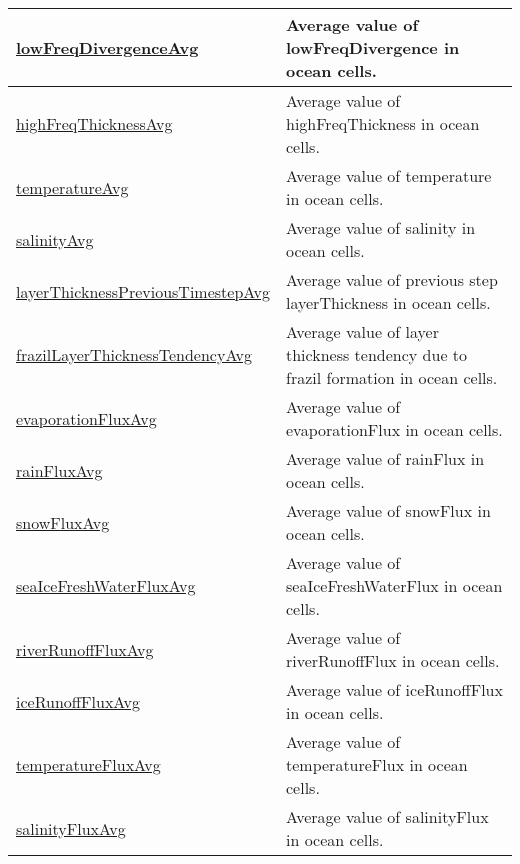 {\begin{center}
\begin{longtable}{| p{2.0in} | p{4.0in} |}
    \hline
    \hyperref[subsec:var_sec_globalStatsAM_lowFreqDivergenceAvg]{lowFreqDivergenceAvg} & Average value of lowFreqDivergence in ocean cells. \\
    \hline
    \hyperref[subsec:var_sec_globalStatsAM_highFreqThicknessAvg]{highFreqThicknessAvg} & Average value of highFreqThickness in ocean cells. \\
    \hline
    \hyperref[subsec:var_sec_globalStatsAM_temperatureAvg]{temperatureAvg} & Average value of temperature in ocean cells. \\
    \hline
    \hyperref[subsec:var_sec_globalStatsAM_salinityAvg]{salinityAvg} & Average value of salinity in ocean cells. \\
    \hline
    \hyperref[subsec:var_sec_globalStatsAM_layerThicknessPreviousTimestepAvg]{layerThicknessPreviousTimestep\-Avg} & Average value of previous step layerThickness in ocean cells. \\
    \hline
    \hyperref[subsec:var_sec_globalStatsAM_frazilLayerThicknessTendencyAvg]{frazilLayerThicknessTendencyAvg} & Average value of layer thickness tendency due to frazil formation in ocean cells. \\
    \hline
    \hyperref[subsec:var_sec_globalStatsAM_evaporationFluxAvg]{evaporationFluxAvg} & Average value of evaporationFlux in ocean cells. \\
    \hline
    \hyperref[subsec:var_sec_globalStatsAM_rainFluxAvg]{rainFluxAvg} & Average value of rainFlux in ocean cells. \\
    \hline
    \hyperref[subsec:var_sec_globalStatsAM_snowFluxAvg]{snowFluxAvg} & Average value of snowFlux in ocean cells. \\
    \hline
    \hyperref[subsec:var_sec_globalStatsAM_seaIceFreshWaterFluxAvg]{seaIceFreshWaterFluxAvg} & Average value of seaIceFreshWaterFlux in ocean cells. \\
    \hline
    \hyperref[subsec:var_sec_globalStatsAM_riverRunoffFluxAvg]{riverRunoffFluxAvg} & Average value of riverRunoffFlux in ocean cells. \\
    \hline
    \hyperref[subsec:var_sec_globalStatsAM_iceRunoffFluxAvg]{iceRunoffFluxAvg} & Average value of iceRunoffFlux in ocean cells. \\
    \hline
    \hyperref[subsec:var_sec_globalStatsAM_temperatureFluxAvg]{temperatureFluxAvg} & Average value of temperatureFlux in ocean cells. \\
    \hline
    \hyperref[subsec:var_sec_globalStatsAM_salinityFluxAvg]{salinityFluxAvg} & Average value of salinityFlux in ocean cells. \\

\end{longtable}
\end{center}}
